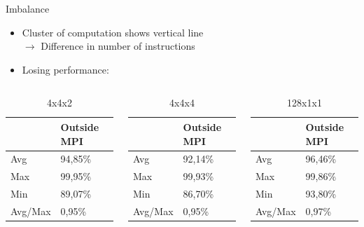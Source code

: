 \documentclass[aspectratio=169]{bredelebeamer}
\begin{document}
\begin{frame}{Imbalance}
\begin{itemize}

\item Cluster of computation shows vertical line\\
    $\rightarrow$ Difference in number of instructions\\
\item Losing performance:
\end{itemize}


\begin{columns}[c]
\begin{table}[h]
\centering
\begin{tabular}{ll}
\toprule
        & Outside MPI \\ \midrule
\rowcolor[HTML]{EFEFEF} 
Avg     & 94,85\%     \\
Max     & 99,95\%     \\
\rowcolor[HTML]{EFEFEF} 
Min     & 89,07\%     \\
Avg/Max & 0,95\%      \\ \bottomrule
\end{tabular}
\caption*{4x4x2}
\label{mpi_4x4x2}
\end{table}



\begin{table}[h]
\centering
\begin{tabular}{ll}
\toprule
        & Outside MPI \\ \midrule
\rowcolor[HTML]{EFEFEF} 
Avg     & 92,14\%     \\
Max     & 99,93\%     \\
\rowcolor[HTML]{EFEFEF} 
Min     & 86,70\%     \\
Avg/Max & 0,95\%      \\ \bottomrule
\end{tabular}
\caption*{4x4x4}
\label{mpi_4x4x4}
\end{table}



\begin{table}[h]
\centering
\begin{tabular}{ll}
\toprule
        & Outside MPI \\ \midrule
\rowcolor[HTML]{EFEFEF} 
Avg     & 96,46\%     \\
Max     & 99,86\%     \\
\rowcolor[HTML]{EFEFEF} 
Min     & 93,80\%     \\
Avg/Max & 0,97\%      \\ \bottomrule
\end{tabular}
\caption*{128x1x1}
\label{mpi_128x1x1}
\end{table}

\end{columns}


\end{frame}
\end{document}
